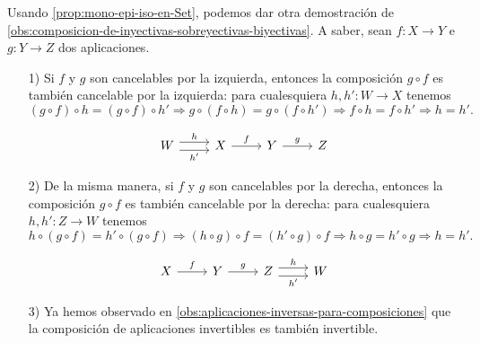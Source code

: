 \begin{comentarioast}
  Usando \ref{prop:mono-epi-iso-en-Set}, podemos dar otra demostración de
  \ref{obs:composicion-de-inyectivas-sobreyectivas-biyectivas}. A saber, sean
  $f\colon X\to Y$ e $g\colon Y\to Z$ dos aplicaciones.

  \begin{enumerate}
  \item[1)] Si $f$ y $g$ son cancelables por la izquierda, entonces
    la composición $g\circ f$ es también cancelable por la izquierda: para
    cualesquiera $h, h'\colon W\to X$ tenemos
    \[ (g\circ f)\circ h = (g\circ f)\circ h' \Longrightarrow
      g\circ (f\circ h) = g\circ (f\circ h') \Longrightarrow
      f\circ h = f\circ h' \Longrightarrow h = h'. \]

    \[ \begin{tikzcd}
        W \ar[shift left=.75ex]{r}{h} \ar[r,shift right=.75ex]{r}[swap]{h'} & X \ar{r}{f} & Y \ar{r}{g} & Z
      \end{tikzcd} \]

  \item[2)] De la misma manera, si $f$ y $g$ son cancelables por la derecha,
    entonces la composición $g\circ f$ es también cancelable por la derecha:
    para cualesquiera $h, h'\colon Z\to W$ tenemos
    \[ h\circ (g\circ f) = h'\circ (g\circ f) \Longrightarrow
      (h\circ g)\circ f = (h'\circ g)\circ f \Longrightarrow
      h\circ g = h'\circ g \Longrightarrow h = h'. \]

    \[ \begin{tikzcd}
        X \ar{r}{f} & Y \ar{r}{g} & Z \ar[shift left=.75ex]{r}{h} \ar[r,shift right=.75ex]{r}[swap]{h'} & W
      \end{tikzcd} \]

  \item[3)] Ya hemos observado en
    \ref{obs:aplicaciones-inversas-para-composiciones} que la composición de
    aplicaciones invertibles es también invertible.
  \end{enumerate}
\end{comentarioast}


